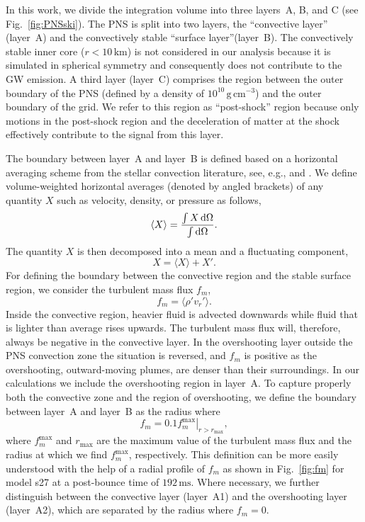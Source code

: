 In this work, we divide the integration volume into three layers~A, B, and C (see
Fig.~\ref{fig:PNSski}). The PNS is split into two layers, the
``convective layer'' (layer~A) and the convectively stable ``surface layer''(layer~B).  The convectively stable inner core ($r<10 \, \mathrm{km}$) is not considered in our analysis because it is simulated in spherical symmetry and consequently does not contribute to the GW emission.
A third layer (layer~C) comprises the region between the outer boundary
of the PNS (defined by a density of $10^{10} \, \mathrm{g}
\, \mathrm{cm}^{-3}$) and the outer boundary of the grid. We refer
to this region as ``post-shock'' region because
only  motions in the post-shock region and the deceleration of matter
at the shock effectively contribute to the signal from this layer.

The boundary between layer~A and layer~B is defined based on a horizontal averaging scheme
from the stellar convection literature, see, e.g., \citet{nordlund_09}
and \cite{viallet_13}. We define volume-weighted horizontal averages
(denoted by angled brackets) of any quantity $X$ such as velocity,
density, or pressure as follows,
\begin{equation}
\langle X \rangle = \frac{\int X \, \mathrm{d} \Omega }{\int \mathrm{d} \Omega}.  
\end{equation}
The quantity $X$ is then decomposed into a mean and a fluctuating component,
\begin{equation}
X = \langle X \rangle + X'.
\end{equation}
For defining the boundary between the convective region and the stable surface region, we consider the turbulent mass flux $f_m$,
\begin{equation} \label{eq:mflux}
f_m = \langle \rho' v_r'\rangle. 
\end{equation}
Inside the convective region, heavier fluid is
advected downwards while fluid that is lighter than average rises
upwards. The turbulent mass flux will, therefore, always be negative
in the convective layer. 
In the overshooting layer outside the PNS convection zone the
situation is reversed, and $f_m$ is positive as
the overshooting, outward-moving plumes, are denser
than their surroundings.  In our calculations we
include the overshooting region in layer~A. To capture
properly both the convective zone and the region of overshooting, we
define the boundary between layer~A and
layer~B as the radius where
\begin{equation} 
 f_m  = \left.  0.1 f_m^\mathrm{max}\right  |_{r>r_\mathrm{max}},
\end{equation} 
where
$f_m^\mathrm{max}$ and $r_\mathrm{max}$ are the maximum value of the turbulent mass flux and the radius at which we find $f_m^\mathrm{max}$, respectively.   
This definition can be more easily understood with the help of a radial profile of $f_m$ as shown in Fig.~\ref{fig:fm} for model s27 at a post-bounce time of 
$192 \, \mathrm{ms}$. Where necessary, we further distinguish between the convective layer
(layer~A1) and the overshooting layer (layer~A2), which are separated
by the radius where $f_m=0$.

